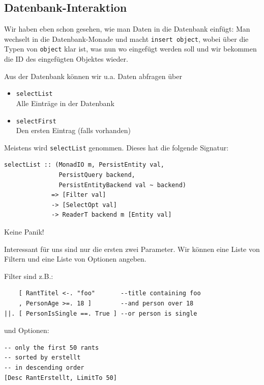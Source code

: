 \documentclass{beamer}
\begin{document}
\subsection{Datenbank-Interaktion}

\begin{frame}[fragile]
Wir haben eben schon gesehen, wie man Daten in die Datenbank einfügt: Man wechselt in die Datenbank-Monade und macht \texttt{insert object}, wobei über die Typen von \texttt{object} klar ist, was nun wo eingefügt werden soll und wir bekommen die ID des eingefügten Objektes wieder.
\pause
\bigskip

Aus der Datenbank können wir u.a. Daten abfragen über
\pause
\begin{itemize}
 \item \texttt{selectList}\\
       Alle Einträge in der Datenbank
 \pause
 \item \texttt{selectFirst}\\
       Den ersten Eintrag (falls vorhanden)
\end{itemize}
\end{frame}

\begin{frame}[fragile]
Meistens wird \texttt{selectList} genommen. Dieses hat die folgende Signatur:
\bigskip

\begin{verbatim}
selectList :: (MonadIO m, PersistEntity val,
               PersistQuery backend,
               PersistEntityBackend val ~ backend)
             => [Filter val] 
             -> [SelectOpt val] 
             -> ReaderT backend m [Entity val]
\end{verbatim}
\pause
Keine Panik!
\end{frame}

\begin{frame}[fragile]
Interessant für uns sind nur die ersten zwei Parameter. Wir können eine Liste von Filtern und eine Liste von Optionen angeben.
\pause
\bigskip

Filter sind z.B.:
\begin{verbatim}
    [ RantTitel <-. "foo"       --title containing foo
    , PersonAge >=. 18 ]        --and person over 18
||. [ PersonIsSingle ==. True ] --or person is single
\end{verbatim}
\pause
\smallskip

und Optionen:
\begin{verbatim}
-- only the first 50 rants 
-- sorted by erstellt
-- in descending order
[Desc RantErstellt, LimitTo 50]
\end{verbatim}
\end{frame}
\end{document}
